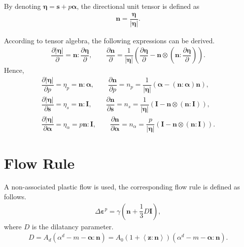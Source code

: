 \documentclass[11pt,a4paper]{article}
\newcommand*{\pfrac}[2]{\dfrac{\partial#1}{\partial#2}}
\begin{document}
By denoting $\mathbold{\eta}=\mathbold{s}+p\mathbold{\alpha}$, the directional unit tensor is defined as
\begin{gather}
\mathbold{n}=\dfrac{\mathbold{\eta}}{\big|\mathbold{\eta}\big|}.
\end{gather}

According to tensor algebra, the following expressions can be derived.
\begin{gather*}
\pfrac{|\mathbold{\eta}|}{}=\mathbold{n}:\pfrac{\mathbold{\eta}}{},\qquad
\pfrac{\mathbold{n}}{}=\dfrac{1}{|\mathbold{\eta}|}\left(\pfrac{\mathbold{\eta}}{}-\mathbold{n}\otimes\left(\mathbold{n}:\pfrac{\mathbold{\eta}}{}\right)\right).
\end{gather*}
Hence,
\begin{gather*}
\pfrac{|\mathbold{\eta}|}{p}=\eta_p=\mathbold{n}:\mathbold{\alpha},\qquad
\pfrac{\mathbold{n}}{p}=n_p=\dfrac{1}{|\mathbold{\eta}|}\left(\mathbold{\alpha}-\left(\mathbold{n}:\mathbold{\alpha}\right)\mathbold{n}\right),\\
\pfrac{|\mathbold{\eta}|}{\mathbold{s}}=\eta_s=\mathbold{n}:\mathbf{I},\qquad
\pfrac{\mathbold{n}}{\mathbold{s}}=n_s=\dfrac{1}{|\mathbold{\eta}|}\left(\mathbf{I}-\mathbold{n}\otimes\left(\mathbold{n}:\mathbf{I}\right)\right),\\
\pfrac{|\mathbold{\eta}|}{\mathbold{\alpha}}=\eta_\alpha=p\mathbold{n}:\mathbf{I},\qquad
\pfrac{\mathbold{n}}{\mathbold{\alpha}}=n_\alpha=\dfrac{p}{|\mathbold{\eta}|}\left(\mathbf{I}-\mathbold{n}\otimes\left(\mathbold{n}:\mathbf{I}\right)\right).
\end{gather*}

\section{Flow Rule}
A non-associated plastic flow is used, the corresponding flow rule is defined as follows.
\begin{gather}
\Delta\mathbold{\varepsilon}^p=\gamma\left(\mathbold{n}+\dfrac{1}{3}D\mathbold{I}\right),
\end{gather}
where $D$ is the dilatancy parameter.
\begin{gather}
D=A_d\left(\alpha^d-m-\mathbold{\alpha}:\mathbold{n}\right)=A_0\left(1+\left\langle\mathbold{z}:\mathbold{n}\right\rangle\right)\left(\alpha^d-m-\mathbold{\alpha}:\mathbold{n}\right).
\end{gather}
\end{document}

